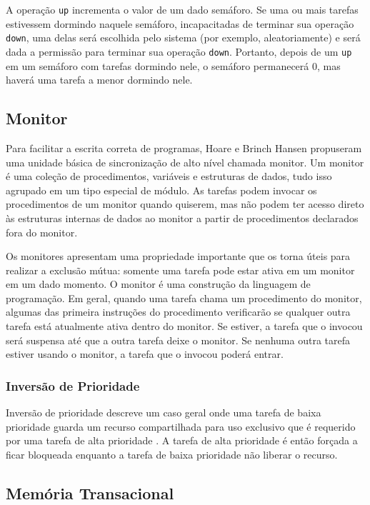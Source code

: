 A operação \texttt{up} incrementa o valor de um dado semáforo. Se uma
ou mais tarefas estivessem dormindo naquele semáforo, incapacitadas de
terminar sua operação \texttt{down}, uma delas será escolhida pelo sistema
(por exemplo, aleatoriamente) e será dada a permissão para terminar sua
operação \texttt{down}. Portanto, depois de um \texttt{up} em um semáforo
com tarefas dormindo nele, o semáforo permanecerá 0, mas haverá uma tarefa
a menor dormindo nele.

\subsection{Monitor}

Para facilitar a escrita correta de programas, Hoare e Brinch Hansen propuseram
uma unidade básica de sincronização de alto nível chamada monitor.
Um monitor é uma coleção de procedimentos, variáveis e estruturas de dados,
tudo isso agrupado em um tipo especial de módulo. As tarefas podem invocar
os procedimentos de um monitor quando quiserem, mas não podem ter acesso
direto às estruturas internas de dados ao monitor a partir de procedimentos
declarados fora do monitor.

Os monitores apresentam uma propriedade importante que os torna úteis
para realizar a exclusão mútua: somente uma tarefa pode estar ativa em um
monitor em um dado momento. O monitor é uma construção da linguagem de
programação. Em geral, quando uma tarefa chama um procedimento do monitor,
algumas das primeira instruções do procedimento verificarão se qualquer
outra tarefa está atualmente ativa dentro do monitor. Se estiver, a tarefa
que o invocou será suspensa até que a outra tarefa deixe o monitor. Se nenhuma
outra tarefa estiver usando o monitor, a tarefa que o invocou poderá entrar.

\subsubsection{Inversão de Prioridade}

Inversão de prioridade descreve um caso geral onde uma tarefa de baixa
prioridade guarda um recurso compartilhada para uso exclusivo que é
requerido por uma tarefa de alta prioridade \cite{intel}. A tarefa de alta
prioridade é então forçada a ficar bloqueada enquanto a tarefa de baixa
prioridade não liberar o recurso.

\subsection{Memória Transacional}


